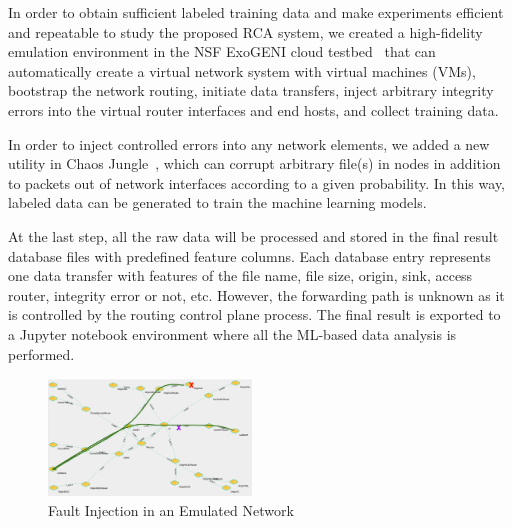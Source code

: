 In order to obtain sufficient labeled training data and make experiments efficient and repeatable to study the proposed RCA system, 
we created a high-fidelity emulation environment in the NSF ExoGENI cloud testbed~\cite{ExoGENI:web} that can automatically create a virtual network system with virtual machines (VMs), bootstrap the network routing, 
initiate data transfers, inject arbitrary integrity errors into the virtual router interfaces and end hosts, and collect training data.

In order to inject controlled errors into any network elements, we added a new utility in Chaos Jungle~\cite{swip:pearc:2019,chaosjungle:web}, which can corrupt arbitrary file(s) in nodes in addition to packets out of network interfaces according to a given probability. In this way, labeled data can be generated to train the machine learning models. 

At the last step, all the raw data will be processed and stored in the final result database files with predefined feature columns. Each database entry represents one data transfer with features of the file name, file size, origin, sink, access router, integrity error or not, etc. However, the forwarding path is unknown as it is controlled by the routing control plane process. The final result is exported to a Jupyter notebook environment where all the ML-based data analysis is performed.


\begin{figure}[!ht]
\begin{center}
\includegraphics[width=0.48\textwidth]{./figure/ChaosJungle}
\end{center}
\caption{Fault Injection in an Emulated Network}
\label{fig:topology}
\end{figure}

